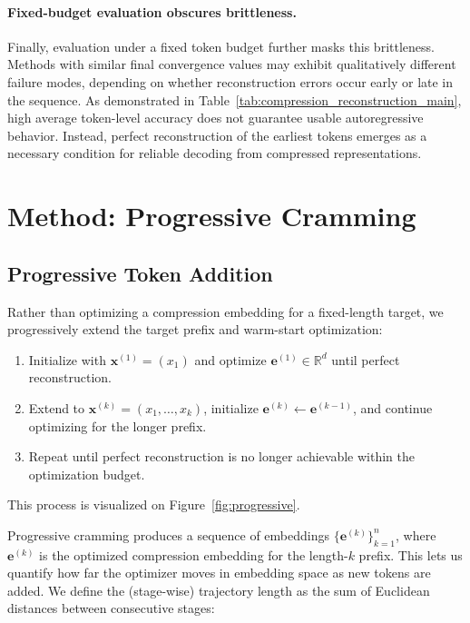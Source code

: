 \documentclass{article}
\theoremstyle{plain}
\theoremstyle{definition}
\theoremstyle{remark}
\begin{document}
\paragraph{Fixed-budget evaluation obscures brittleness.}
Finally, evaluation under a fixed token budget further masks this brittleness.
Methods with similar final convergence values may exhibit qualitatively different
failure modes, depending on whether reconstruction errors occur early or late in
the sequence.
As demonstrated in Table~\ref{tab:compression_reconstruction_main}, high average
token-level accuracy does not guarantee usable autoregressive behavior.
Instead, perfect reconstruction of the earliest tokens emerges as a necessary
condition for reliable decoding from compressed representations.

\section{Method: Progressive Cramming}
\label{sec:method}

\subsection{Progressive Token Addition}
\label{sec:progressive}

Rather than optimizing a compression embedding for a fixed-length target, we progressively extend the target prefix and warm-start optimization:
%
\begin{enumerate}
    \item Initialize with $\mathbf{x}^{(1)} = (x_1)$ and optimize $\mathbf{e}^{(1)} \in \mathbb{R}^d$ until perfect reconstruction.
    \item Extend to $\mathbf{x}^{(k)} = (x_1, \ldots, x_k)$, initialize $\mathbf{e}^{(k)} \leftarrow \mathbf{e}^{(k-1)}$, and continue optimizing for the longer prefix.
    \item Repeat until perfect reconstruction is no longer achievable within the optimization budget.
\end{enumerate}

This process is visualized on Figure~\ref{fig:progressive}.

Progressive cramming produces a sequence of embeddings $\{\mathbf{e}^{(k)}\}_{k=1}^{n}$, where $\mathbf{e}^{(k)}$ is the optimized compression embedding for the length-$k$ prefix.
This lets us quantify how far the optimizer moves in embedding space as new tokens are added.
We define the (stage-wise) trajectory length as the sum of Euclidean distances between consecutive stages:
\end{document}
